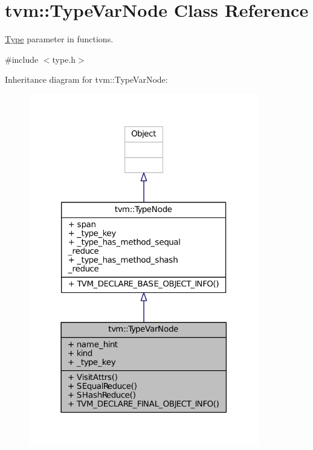 \hypertarget{classtvm_1_1TypeVarNode}{}\section{tvm\+:\+:Type\+Var\+Node Class Reference}
\label{classtvm_1_1TypeVarNode}


\hyperlink{classtvm_1_1Type}{Type} parameter in functions.  




{\ttfamily \#include $<$type.\+h$>$}



Inheritance diagram for tvm\+:\+:Type\+Var\+Node\+:
\nopagebreak
\begin{figure}[H]
\begin{center}
\leavevmode
\includegraphics[width=285pt]{classtvm_1_1TypeVarNode__inherit__graph}
\end{center}
\end{figure}


